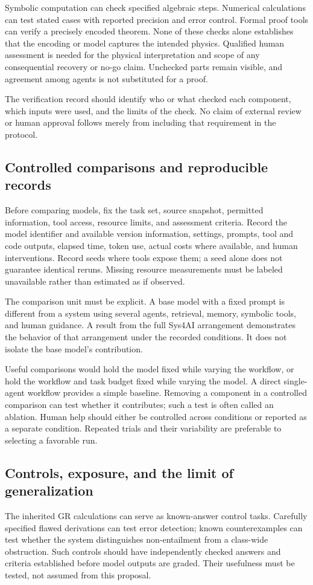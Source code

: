 \documentclass[11pt,oneside]{report}
\theoremstyle{remark}
\numberwithin{definition}{chapter}
\numberwithin{proposition}{chapter}
\numberwithin{remark}{chapter}
\begin{document}
Symbolic computation can check specified algebraic steps. Numerical calculations can test stated cases with reported precision and error control. Formal proof tools can verify a precisely encoded theorem. None of these checks alone establishes that the encoding or model captures the intended physics. Qualified human assessment is needed for the physical interpretation and scope of any consequential recovery or no-go claim. Unchecked parts remain visible, and agreement among agents is not substituted for a proof.

The verification record should identify who or what checked each component, which inputs were used, and the limits of the check. No claim of external review or human approval follows merely from including that requirement in the protocol.

\subsection{Controlled comparisons and reproducible records}
Before comparing models, fix the task set, source snapshot, permitted information, tool access, resource limits, and assessment criteria. Record the model identifier and available version information, settings, prompts, tool and code outputs, elapsed time, token use, actual costs where available, and human interventions. Record seeds where tools expose them; a seed alone does not guarantee identical reruns. Missing resource measurements must be labeled unavailable rather than estimated as if observed.

The comparison unit must be explicit. A base model with a fixed prompt is different from a system using several agents, retrieval, memory, symbolic tools, and human guidance. A result from the full Sys4AI arrangement demonstrates the behavior of that arrangement under the recorded conditions. It does not isolate the base model's contribution.

Useful comparisons would hold the model fixed while varying the workflow, or hold the workflow and task budget fixed while varying the model. A direct single-agent workflow provides a simple baseline. Removing a component in a controlled comparison can test whether it contributes; such a test is often called an ablation. Human help should either be controlled across conditions or reported as a separate condition. Repeated trials and their variability are preferable to selecting a favorable run.

\subsection{Controls, exposure, and the limit of generalization}
The inherited GR calculations can serve as known-answer control tasks. Carefully specified flawed derivations can test error detection; known counterexamples can test whether the system distinguishes non-entailment from a class-wide obstruction. Such controls should have independently checked answers and criteria established before model outputs are graded. Their usefulness must be tested, not assumed from this proposal.
\end{document}
